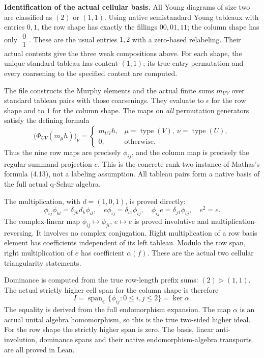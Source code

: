 \documentclass[11pt]{article}
\newcommand{\C}{\mathbb C}
\newcommand{\Span}{\operatorname{span}}
\begin{document}
\newpage
\textbf{Identification of the actual cellular basis.}
All Young diagrams of size two are classified as $(2)$ or $(1,1)$.
Using native semistandard Young tableaux with entries $0,1$, the row shape
has exactly the fillings $00,01,11$; the column shape has only
$\begin{smallmatrix}0\\1\end{smallmatrix}$.
These are the usual entries $1,2$ with a zero-based relabeling. Their
actual contents give the three weak compositions above. For each shape,
the unique standard tableau has content $(1,1)$; its true entry permutation
and every coarsening to the specified content are computed.

The file constructs the Murphy elements and the actual finite sums
$m_{UV}$ over standard tableau pairs with those coarsenings. They evaluate
to $\epsilon$ for the row shape and to $1$ for the column shape. The maps
on \emph{all} permutation generators satisfy the defining formula
\[
 \bigl(\Phi_{UV}(m_\mu h)\bigr)_\nu
 =\begin{cases}
 m_{UV}h,&\mu=\operatorname{type}(V),\ \nu=\operatorname{type}(U),\\
 0,&\text{otherwise}.
 \end{cases}
\]
Thus the nine row maps are precisely $\phi_{ij}$, and the column map is
precisely the regular-summand projection $e$. This is the concrete
rank-two instance of Mathas's formula (4.13), not a labeling assumption.
All tableau pairs form a native basis of the full actual q-Schur algebra.

The multiplication, with $d=(1,0,1)$, is proved directly:
\[
 \phi_{ij}\phi_{kl}=\delta_{jk}d_k\phi_{il},\quad
 e\phi_{ij}=\delta_{i1}\phi_{ij},\quad
 \phi_{ij}e=\delta_{j1}\phi_{ij},\quad e^2=e.
\]
The complex-linear map $\phi_{ij}\mapsto\phi_{ji}$, $e\mapsto e$
is proved involutive and multiplication-reversing. It involves no complex
conjugation. Right multiplication of a row basis element has coefficients
independent of its left tableau. Modulo the row span, right multiplication
of $e$ has coefficient $\alpha(f)$. These are the actual two cellular
triangularity statements.

Dominance is computed from the true row-length prefix sums:
$(2)\triangleright(1,1)$. The actual strictly higher cell span for the
column shape is therefore
\[
 I=\Span_\C\{\phi_{ij}:0\le i,j\le2\}=\ker\alpha.
\]
The equality is derived from the full endomorphism expansion. The map
$\alpha$ is an actual unital algebra homomorphism, so this is the true
two-sided higher ideal. For the row shape the strictly higher span is zero.
The basis, linear anti-involution, dominance spans and their native
endomorphism-algebra transports are all proved in Lean.
\end{document}
